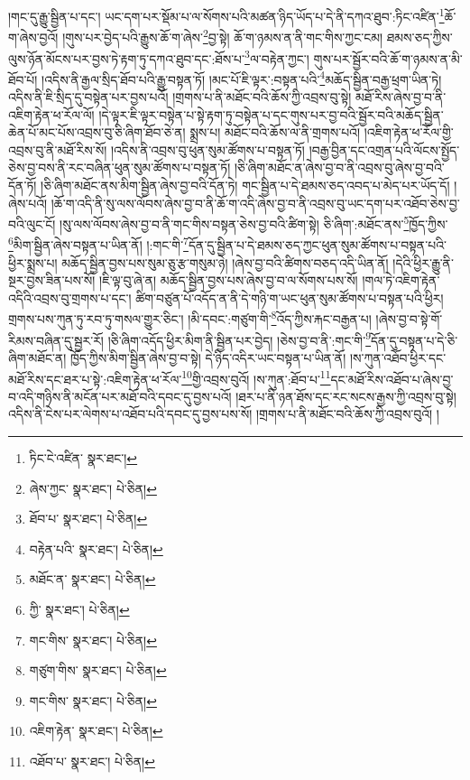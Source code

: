 །གང་དུ་རྒྱུ་སྦྱིན་པ་དང་། ཡང་དག་པར་སྡོམ་པ་ལ་སོགས་པའི་མཚན་ཉིད་ཡོད་པ་དེ་ནི་དཀའ་ཐུབ་:ཏིང་འཛིན་\footnote{ཏིང་ངེ་འཛིན་  སྣར་ཐང་། }ཆོ་ག་ཞེས་བྱའོ། །གུས་པར་བྱེད་པའི་རྒྱུས་ཆོ་ག་ཞེས་\footnote{ཞེས་ཀྱང་  སྣར་ཐང་།  པེ་ཅིན། }བྱ་སྟེ། ཆོ་ག་ཉམས་ན་ནི་གང་གིས་ཀྱང་ངམ། ཐམས་ཅད་ཀྱིས་ལུས་ཉོན་མོངས་པར་བྱས་ཏེ་རྟག་ཏུ་དཀའ་ཐུབ་དང་:ཐོས་པ་\footnote{ཐོབ་པ་  སྣར་ཐང་།  པེ་ཅིན། }ལ་བརྟེན་ཀྱང་། གུས་པར་སྦྱོར་བའི་ཆོ་ག་ཉམས་ན་མི་ཐོབ་པོ། །འདིས་ནི་རྒྱལ་སྲིད་ཐོབ་པའི་རྒྱུ་བསྟན་ཏོ། །མང་པོ་ཇི་ལྟར་:བསྟན་པའི་\footnote{བརྟེན་པའི་  སྣར་ཐང་།  པེ་ཅིན། }མཆོད་སྦྱིན་བརྒྱ་ཕྲག་ཡིན་ཏེ། འདིས་ནི་ཇི་སྲིད་དུ་བསྟེན་པར་བྱས་པའོ། །གྲགས་པ་ནི་མཐོང་བའི་ཆོས་ཀྱི་འབྲས་བུ་སྟེ། མཐོ་རིས་ཞེས་བྱ་བ་ནི་འཇིག་རྟེན་ཕ་རོལ་ལོ། །དེ་ལྟར་ཇི་ལྟར་བསྟེན་པ་སྟེ་རྟག་ཏུ་བསྟེན་པ་དང་གུས་པར་བྱ་བའི་སྦྱོར་བའི་མཆོད་སྦྱིན་ཆེན་པོ་མང་པོས་འབྲས་བུ་ཅི་ཞིག་ཐོབ་ཅེ་ན། སྨྲས་པ། མཐོང་བའི་ཆོས་ལ་ནི་གྲགས་པའོ། །འཇིག་རྟེན་ཕ་རོལ་གྱི་འབྲས་བུ་ནི་མཐོ་རིས་སོ། །འདིས་ནི་འབྲས་བུ་ཕུན་སུམ་ཚོགས་པ་བསྟན་ཏོ། །བརྒྱ་བྱིན་དང་འགྲན་པའི་ལོངས་སྤྱོད་ཅེས་བྱ་བས་ནི་རང་བཞིན་ཕུན་སུམ་ཚོགས་པ་བསྟན་ཏོ། །ཅི་ཞིག་མཐོང་ན་ཞེས་བྱ་བ་ནི་འབྲས་བུ་ཞེས་བྱ་བའི་དོན་ཏོ། །ཅི་ཞིག་མཐོང་ནས་མིག་སྦྱིན་ཞེས་བྱ་བའི་དོན་ཏེ། གང་སྦྱིན་པ་དེ་ཐམས་ཅད་འབད་པ་མེད་པར་ཡོད་དོ། །ཞེས་པའོ། །ཆོ་ག་འདི་ནི་སུ་ལས་ལོབས་ཞེས་བྱ་བ་ནི་ཆོ་ག་འདི་ཞེས་བྱ་བ་ནི་འབྲས་བུ་ཡང་དག་པར་འཐོབ་ཅེས་བྱ་བའི་ལུང་ངོ། །སུ་ལས་ལོབས་ཞེས་བྱ་བ་ནི་གང་གིས་བསྟན་ཅེས་བྱ་བའི་ཚིག་སྟེ། ཅི་ཞིག་:མཐོང་ནས་\footnote{མཐོང་ན་  སྣར་ཐང་།  པེ་ཅིན། }ཁྱོད་ཀྱིས་\footnote{ཀྱི་  སྣར་ཐང་།  པེ་ཅིན། }མིག་སྦྱིན་ཞེས་བསྟན་པ་ཡིན་ནོ། །:གང་གི་\footnote{གང་གིས་  སྣར་ཐང་།  པེ་ཅིན། }དོན་དུ་སྦྱིན་པ་དེ་ཐམས་ཅད་ཀྱང་ཕུན་སུམ་ཚོགས་པ་བསྟན་པའི་ཕྱིར་སྨྲས་པ། མཆོད་སྦྱིན་བྱས་པས་སུམ་ཅུ་རྩ་གསུམ་ཉེ། །ཞེས་བྱ་བའི་ཚིགས་བཅད་འདི་ཡིན་ནོ། །དེའི་ཕྱིར་རྒྱུ་ནི་སྔར་བྱས་ཟིན་པས་སོ། །ཇི་ལྟ་བུ་ཞེ་ན། མཆོད་སྦྱིན་བྱས་པས་ཞེས་བྱ་བ་ལ་སོགས་པས་སོ། །གལ་ཏེ་འཇིག་རྟེན་འདིའི་འབྲས་བུ་གྲགས་པ་དང་། ཚིག་བཙུན་པོ་འདོད་ན་ནི་དེ་གཉི་ག་ཡང་ཕུན་སུམ་ཚོགས་པ་བསྟན་པའི་ཕྱིར། གྲགས་པས་ཀུན་ཏུ་རབ་ཏུ་གསལ་གྱུར་ཅིང་། །མི་དབང་:གཙུག་གི་\footnote{གཙུག་གིས་  སྣར་ཐང་།  པེ་ཅིན། }འོད་ཀྱིས་རྐང་བརྒྱན་པ། །ཞེས་བྱ་བ་སྟེ་གོ་རིམས་བཞིན་དུ་སྦྱར་རོ། །ཅི་ཞིག་འདོད་ཕྱིར་མིག་ནི་སྦྱིན་པར་བྱེད། །ཅེས་བྱ་བ་ནི་:གང་གི་\footnote{གང་གིས་  སྣར་ཐང་།  པེ་ཅིན། }དོན་དུ་བསྟན་པ་དེ་ཅི་ཞིག་མཐོང་ན། ཁྱོད་ཀྱིས་མིག་སྦྱིན་ཞེས་བྱ་བ་སྟེ། དེ་ཉིད་འདིར་ཡང་བསྟན་པ་ཡིན་ནོ། །ས་ཀུན་འཐོབ་ཕྱིར་དང་མཐོ་རིས་དང་ཐར་པ་སྟེ་:འཇིག་རྟེན་ཕ་རོལ་\footnote{འཇིག་རྟེན་  སྣར་ཐང་།  པེ་ཅིན། }གྱི་འབྲས་བུའོ། །ས་ཀུན་:ཐོབ་པ་\footnote{འཐོབ་པ་  སྣར་ཐང་།  པེ་ཅིན། }དང་མཐོ་རིས་འཐོབ་པ་ཞེས་བྱ་བ་འདི་གཉིས་ནི་མངོན་པར་མཐོ་བའི་དབང་དུ་བྱས་པའོ། །ཐར་པ་ནི་ཉན་ཐོས་དང་རང་སངས་རྒྱས་ཀྱི་འབྲས་བུ་སྟེ། འདིས་ནི་ངེས་པར་ལེགས་པ་འཐོབ་པའི་དབང་དུ་བྱས་པས་སོ། །གྲགས་པ་ནི་མཐོང་བའི་ཆོས་ཀྱི་འབྲས་བུའོ། །
